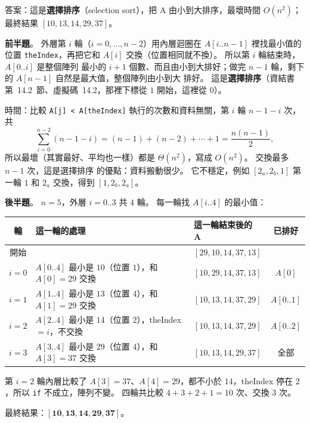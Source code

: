 \begin{pastsoln}
答案：這是\textbf{選擇排序}（selection sort），把 A 由小到大排序，最壞時間 $O(n^2)$；
最終結果 $[10, 13, 14, 29, 37]$。

\textbf{前半題}。 外層第 $i$ 輪（$i = 0, \ldots, n - 2$）用內層迴圈在 $A[i..n-1]$ 裡找最小值的位置
\texttt{theIndex}，再把它和 $A[i]$ 交換（位置相同就不換）。 所以第 $i$ 輪結束時，$A[0..i]$ 是整個陣列
最小的 $i + 1$ 個數、而且由小到大排好；做完 $n - 1$ 輪，剩下的 $A[n-1]$ 自然是最大值，整個陣列由小到大
排好。 這是\textbf{選擇排序}（資結書第~14.2~節、虛擬碼~14.2，那裡下標從 $1$ 開始，這裡從 $0$）。

時間：比較 \texttt{A[j] < A[theIndex]} 執行的次數和資料無關，第 $i$ 輪 $n - 1 - i$ 次，共
\[
\sum_{i=0}^{n-2} (n - 1 - i) = (n - 1) + (n - 2) + \cdots + 1 = \frac{n(n-1)}{2},
\]
所以最壞（其實最好、平均也一樣）都是 $\Theta(n^2)$，寫成 $O(n^2)$。 交換最多 $n - 1$ 次，這是選擇排序
的優點：資料搬動很少。 它不穩定，例如 $[2_a, 2_b, 1]$ 第一輪 $1$ 和 $2_a$ 交換，得到
$[1, 2_b, 2_a]$。

\textbf{後半題}。 $n = 5$，外層 $i = 0..3$ 共 $4$ 輪。 每一輪找 $A[i..4]$ 的最小值：
\begin{center}
\small
\begin{tabular}{cllc}
\toprule
輪 & 這一輪的處理 & 這一輪結束後的 A & 已排好 \\
\midrule
開始 & & $[29, 10, 14, 37, 13]$ & \\
$i = 0$ & $A[0..4]$ 最小是 $10$（位置 $1$），和 $A[0] = 29$ 交換 & $[10, 29, 14, 37, 13]$ & $A[0]$ \\
$i = 1$ & $A[1..4]$ 最小是 $13$（位置 $4$），和 $A[1] = 29$ 交換 & $[10, 13, 14, 37, 29]$ & $A[0..1]$ \\
$i = 2$ & $A[2..4]$ 最小是 $14$（位置 $2$），theIndex $= i$，不交換 & $[10, 13, 14, 37, 29]$ & $A[0..2]$ \\
$i = 3$ & $A[3..4]$ 最小是 $29$（位置 $4$），和 $A[3] = 37$ 交換 & $[10, 13, 14, 29, 37]$ & 全部 \\
\bottomrule
\end{tabular}
\end{center}
第 $i = 2$ 輪內層比較了 $A[3] = 37$、$A[4] = 29$，都不小於 $14$，theIndex 停在 $2$，所以 \texttt{if}
不成立，陣列不變。 四輪共比較 $4 + 3 + 2 + 1 = 10$ 次、交換 $3$ 次。

最終結果：$\mathbf{[10, 13, 14, 29, 37]}$。
\end{pastsoln}
